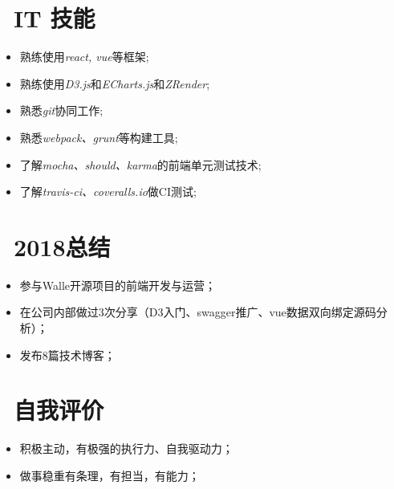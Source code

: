 \documentclass{resume}
\begin{document}
\section{\faCogs\ IT 技能}
\begin{itemize}[parsep=0.5ex]
  \item 熟练使用\textit{react, vue}等框架;
  \item 熟练使用\textit{D3.js}和\textit{ECharts.js}和\textit{ZRender};
  \item 熟悉\textit{git}协同工作;
  \item 熟悉\textit{webpack、grunt}等构建工具;
  \item 了解\textit{mocha、should、karma}的前端单元测试技术;
  \item 了解\textit{travis-ci、coveralls.io}做CI测试;
\end{itemize}

\section{\faInfo\  2018总结}
\begin{itemize}
  \item 参与Walle开源项目的前端开发与运营；
  \item 在公司内部做过3次分享（D3入门、swagger推广、vue数据双向绑定源码分析）；
  \item 发布8篇技术博客；
\end{itemize}

\section{\faInfo\  自我评价}
\begin{itemize}
  \item 积极主动，有极强的执行力、自我驱动力；
  \item 做事稳重有条理，有担当，有能力；
\end{itemize}
\end{document}
